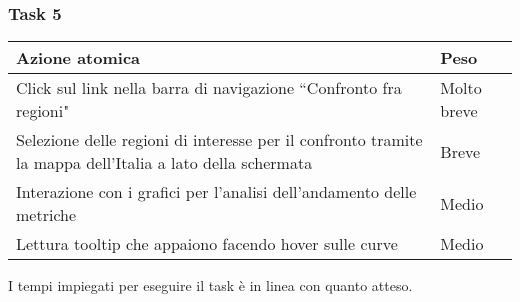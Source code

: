\subsubsection{Task 5}
\label{sss:iaa-task-5}

{
\renewcommand{\arraystretch}{2}
\begin{longtable}[h]{| p{14cm} | p{2.5cm} |}
    \hline
    \textbf{Azione atomica} & \textbf{Peso} \\
    \hline
    \endhead
    Click sul link nella barra di navigazione ``Confronto fra regioni" & Molto breve \\
    \hline
    Selezione delle regioni di interesse per il confronto tramite la mappa dell'Italia a lato della schermata & Breve \\
    \hline
    Interazione con i grafici per l'analisi dell'andamento delle metriche & Medio \\
    \hline
    Lettura tooltip che appaiono facendo hover sulle curve & Medio \\
    \hline
\end{longtable}
}
I tempi impiegati per eseguire il task è in linea con quanto atteso.